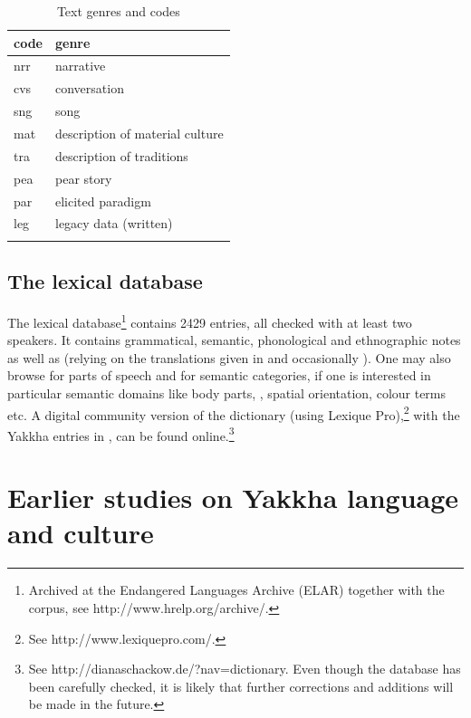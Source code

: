 \begin{table}[htp]
\begin{center}
\begin{tabular}{ll}
\lsptoprule
{\sc code}&{\sc genre}\\
\midrule
nrr & narrative \\
cvs & conversation \\
sng & song\\
mat & description of material culture\\
tra & description of traditions\\
pea & pear story\\
par & elicited paradigm\\
leg & legacy data (written)\\
\lspbottomrule
\end{tabular}
\caption{Text genres and codes}\label{tab-genre}
\end{center}
\end{table}


\subsection{The lexical database}

The lexical database\footnote{Archived at the Endangered Languages Archive (ELAR) together with the corpus, see http://www.hrelp.org/archive/.} contains 2429 entries, all checked with at least two speakers. It contains grammatical, semantic, phonological and ethnographic notes as well as  (relying on the  translations given in \citet{Manandhar2002_Plants} and occasionally \cite{Turner1931A-Comparative}). One may also browse for parts of speech and for semantic categories, if one is interested in particular semantic domains like body parts, , spatial orientation, colour terms etc. A digital community version of the dictionary (using Lexique Pro),\footnote{See http://www.lexiquepro.com/.} with the Yakkha entries in , can be found online.\footnote{See http://dianaschackow.de/?nav=dictionary. Even though the database has been carefully checked, it is likely that further corrections and additions will be made in the future.}


\section{Earlier studies on Yakkha language and culture}\label{earlier-work}


